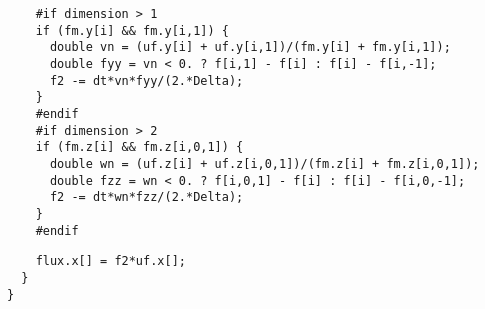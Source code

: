 \documentclass[a4paper]{article}
\newcommand{\para}[1]{\textbf{\emph{\textcolor{para}{#1}}}}
\begin{document}
\begin{multicols}{2}
  \columnbreak
  \begin{verbatim}
    #if dimension > 1
    if (fm.y[i] && fm.y[i,1]) {
      double vn = (uf.y[i] + uf.y[i,1])/(fm.y[i] + fm.y[i,1]);
      double fyy = vn < 0. ? f[i,1] - f[i] : f[i] - f[i,-1];
      f2 -= dt*vn*fyy/(2.*Delta);
    }
    #endif
    #if dimension > 2
    if (fm.z[i] && fm.z[i,0,1]) {
      double wn = (uf.z[i] + uf.z[i,0,1])/(fm.z[i] + fm.z[i,0,1]);
      double fzz = wn < 0. ? f[i,0,1] - f[i] : f[i] - f[i,0,-1];
      f2 -= dt*wn*fzz/(2.*Delta);
    }
    #endif
  \end{verbatim}
\end{multicols}

\begin{center}
\end{center}

\begin{multicols}{2}
  \columnbreak
  \begin{verbatim}
    flux.x[] = f2*uf.x[];
  }
}
  \end{verbatim}
\end{multicols}
\end{document}
